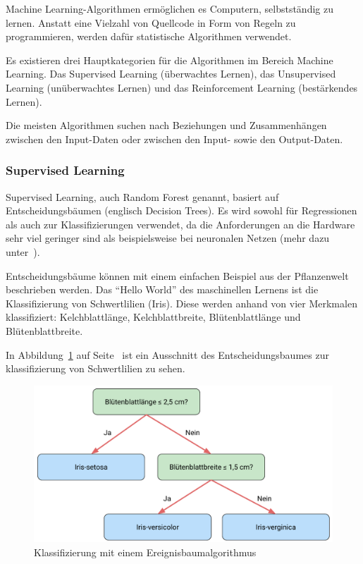 Machine Learning-Algorithmen ermöglichen es Computern, selbstständig zu lernen. Anstatt eine Vielzahl von Quellcode in
Form von Regeln zu programmieren, werden dafür statistische Algorithmen verwendet.

Es existieren drei Hauptkategorien für die Algorithmen im Bereich Machine Learning. Das Supervised Learning (überwachtes
Lernen), das Unsupervised Learning (unüberwachtes Lernen) und das Reinforcement Learning (bestärkendes Lernen).

Die meisten Algorithmen suchen nach Beziehungen und Zusammenhängen zwischen den Input-Daten oder zwischen den Input-
sowie den Output-Daten.

\subsubsection{Supervised Learning}
Supervised Learning, auch Random Forest genannt, basiert auf Entscheidungsbäumen (englisch Decision Trees). Es wird
sowohl für Regressionen als auch zur Klassifizierungen verwendet, da die Anforderungen an die Hardware sehr viel geringer
sind als beispielsweise bei neuronalen Netzen (mehr dazu unter~\cite{book_grundlagen_learnings}).

Entscheidungsbäume können mit einem einfachen Beispiel aus der Pflanzenwelt beschrieben werden. Das
\enquote{Hello World} des maschinellen Lernens ist die Klassifizierung von Schwertlilien (Iris). Diese werden anhand von
vier Merkmalen klassifiziert: Kelchblattlänge, Kelchblattbreite, Blütenblattlänge und Blütenblattbreite.

In Abbildung~\ref{fig:grundlagen_supervised_learning} auf Seite~\pageref{fig:grundlagen_supervised_learning} ist ein
Ausschnitt des Entscheidungsbaumes zur klassifizierung von Schwertlilien zu sehen.

\begin{figure}[h]
    \centering
    \includegraphics[scale=0.55]{images/kapitel_2/supervised_learning.pdf}
    \caption{Klassifizierung mit einem Ereignisbaumalgorithmus}
    \label{fig:grundlagen_supervised_learning}
\end{figure}

